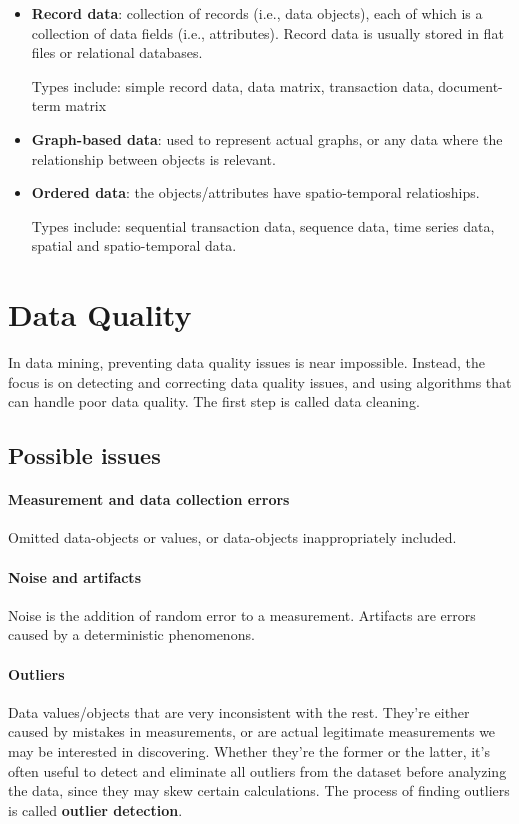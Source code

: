 \begin{itemize}
    \item \textbf{Record data}: collection of records (i.e., data objects), each of which is a collection of data fields (i.e., attributes). Record data is usually stored in flat files or relational databases.

    Types include: simple record data, data matrix, transaction data, document-
    term matrix

    \item \textbf{Graph-based data}: used to represent actual graphs, or any data where the relationship between objects is relevant.

    \item \textbf{Ordered data}: the objects/attributes have spatio-temporal relatioships.

    Types include: sequential transaction data, sequence data, time series data, spatial and spatio-temporal data.
\end{itemize}


\section{Data Quality}

In data mining, preventing data quality issues is near impossible. Instead, the focus is on detecting and correcting data quality issues, and using algorithms that can handle poor data quality. The first step is called data cleaning.

\subsection{Possible issues}

\paragraph{Measurement and data collection errors}
Omitted data-objects or values, or data-objects inappropriately included.

\paragraph{Noise and artifacts}
Noise is the addition of random error to a measurement. Artifacts are errors caused by a deterministic phenomenons.

\paragraph{Outliers}
Data values/objects that are very inconsistent with the rest. They're either caused by mistakes in measurements, or are actual legitimate measurements we may be interested in discovering. Whether they're the former or the latter, it's often useful to detect and eliminate all outliers from the dataset before analyzing the data, since they may skew certain calculations. The process of finding outliers is called \textbf{outlier detection}.

